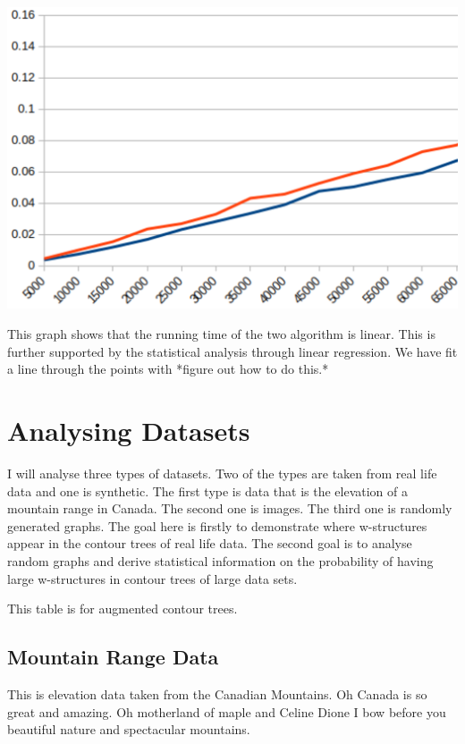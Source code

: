 \includegraphics[left]{./images/running-time.eps}

This graph shows that the running time of the two algorithm is linear. This is further supported by the statistical analysis through linear regression. We have fit a line through the points with *figure out how to do this.*

\section{Analysing Datasets}

I will analyse three types of datasets. Two of the types are taken from real life data and one is synthetic. The first type is data that is the elevation of a mountain range in Canada. The second one is images. The third one is randomly generated graphs. The goal here is firstly to demonstrate where w-structures appear in the contour trees of real life data. The second goal is to analyse random graphs and derive statistical information on the probability of having large w-structures in contour trees of large data sets.


This table is for augmented contour trees.

\subsection{Mountain Range Data}

This is elevation data taken from the Canadian Mountains. Oh Canada is so great and amazing. Oh motherland of maple and Celine Dione I bow before you beautiful nature and spectacular mountains.

